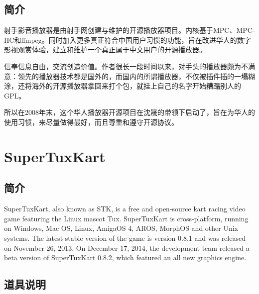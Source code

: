 \documentclass[paper=a4,fontsize=11pt]{article}
\begin{document}
	\subsection{简介}
	射手影音播放器是由射手网创建与维护的开源播放器项目。内核基于MPC、MPC-HC和ffmpeg。同时加入更多真正符合中国用户习惯的功能，旨在改进华人的数字影视观赏体验，建立和维护一个真正属于中文用户的开源播放器。
	
	信奉信息自由，交流创造价值。作者很长一段时间以来，对手头的播放器颇为不满意：领先的播放器技术都是国外的，而国内的所谓播放器，不仅被插件插的一塌糊涂，还将海外的开源播放器拿回来打个包，就挂上自己的名字开始糟蹋别人的GPL。
	
	所以在2008年末，这个华人播放器开源项目在沈晟的带领下启动了，旨在为华人的使用习惯，来尽量做得最好，而且尊重和遵守开源协议。
			
	\section{SuperTuxKart}
	
	\subsection{简介}
	
	SuperTuxKart, also known as STK, is a free and open-source kart racing video game featuring the Linux mascot Tux. SuperTuxKart is cross-platform, running on Windows, Mac OS, Linux, AmigaOS 4, AROS, MorphOS and other Unix systems. The latest stable version of the game is version 0.8.1 and was released on November 26, 2013. On December 17, 2014, the development team released a beta version of SuperTuxKart 0.8.2, which featured an all new graphics engine.
	
	\subsection{道具说明}
	
\end{document}

